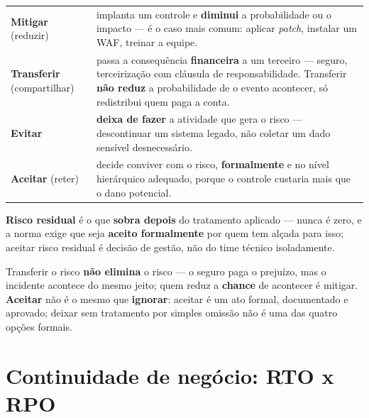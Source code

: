 \begin{conceito}
\begin{center}
\begin{tabular}{@{}p{2.6cm}p{9.4cm}@{}}
\toprule
\textbf{Mitigar} (reduzir) & implanta um controle e \textbf{diminui} a
probabilidade ou o impacto --- é o caso mais comum: aplicar
\textit{patch}, instalar um WAF, treinar a equipe. \\
\textbf{Transferir} (compartilhar) & passa a consequência
\textbf{financeira} a um terceiro --- seguro, terceirização com cláusula
de responsabilidade. Transferir \textbf{não reduz} a probabilidade de o
evento acontecer, só redistribui quem paga a conta. \\
\textbf{Evitar} & \textbf{deixa de fazer} a atividade que gera o risco ---
descontinuar um sistema legado, não coletar um dado sensível
desnecessário. \\
\textbf{Aceitar} (reter) & decide conviver com o risco,
\textbf{formalmente} e no nível hierárquico adequado, porque o controle
custaria mais que o dano potencial. \\
\bottomrule
\end{tabular}
\end{center}

\textbf{Risco residual} é o que \textbf{sobra depois} do tratamento
aplicado --- nunca é zero, e a norma exige que seja \textbf{aceito
formalmente} por quem tem alçada para isso; aceitar risco residual é
decisão de gestão, não do time técnico isoladamente.
\end{conceito}

\begin{cuidado}
Transferir o risco \textbf{não elimina} o risco --- o seguro paga o
prejuízo, mas o incidente acontece do mesmo jeito; quem reduz a
\textbf{chance} de acontecer é mitigar. \textbf{Aceitar} não é o mesmo
que \textbf{ignorar}: aceitar é um ato formal, documentado e aprovado;
deixar sem tratamento por simples omissão não é uma das quatro opções
formais.
\end{cuidado}

\section{Continuidade de negócio: RTO x RPO}

